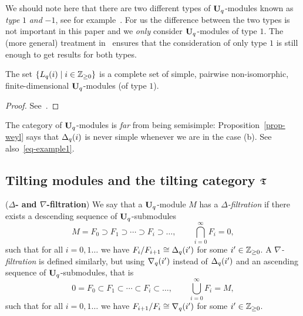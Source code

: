 We should note here that 
there are two different 
types of $\boldsymbol{\mathrm{U}}_q$-modules known as \textit{type} $1$ \textit{and} $-1$, 
see for example~\cite[Section 1]{apw}. 
For us the difference between the two types is not important 
in this paper and we \textit{only} consider $\boldsymbol{\mathrm{U}}_q$-modules of type $1$. 
The (more general) treatment in~\cite[Section 1]{apw} 
ensures that the consideration of only type 
$1$ is still enough to get results for both types.



\begin{cor}\label{cor-simples}
The set $\{L_q({i})\mid i\in\mathbb{Z}_{\geq 0}\}$ is a  
complete set of simple, pairwise non-isomorphic, 
finite-dimensional $\boldsymbol{\mathrm{U}}_q$-modules (of type $1$).\makeqed
\end{cor}


\begin{proof}
See~\cite[Corollary~6.3]{apw}.
\end{proof}



\begin{rem}\label{rem-semisimple}
The category of $\boldsymbol{\mathrm{U}}_q$-modules is 
\textit{far} from being semisimple: Proposition~\ref{prop-weyl} 
says that $\Delta_q({i})$ is never simple whenever we are in the case (b). 
See also~\eqref{eq-example1}.
\end{rem}



\subsection{Tilting modules and the tilting category \texorpdfstring{$\boldsymbol{\mathfrak{T}}$}{T}}\label{sub-tiltmod}
\begin{defn}(\textbf{$\Delta$- and $\nabla$-filtration})\label{defn-filt}
We say that a $\boldsymbol{\mathrm{U}}_q$-module $M$ has 
a $\Delta$\textit{-filtration} if there exists a descending sequence of 
$\boldsymbol{\mathrm{U}}_q$-submodules
\[
M=F_{0}\supset F_1\supset\cdots\supset F_i\supset\dots,\quad\quad\bigcap_{i=0}^{\infty}F_i=0,
\]
such that for all $i=0,1\dots$ we have 
$F_{i}/F_{i+1}\cong \Delta_q({i^{\prime}})$ for 
some $i^{\prime}\in\mathbb{Z}_{\geq 0}$. A $\nabla$\textit{-filtration} is 
defined similarly, but using 
$\nabla_q({i^{\prime}})$ instead of 
$\Delta_q({i^{\prime}})$ and an ascending sequence of $\boldsymbol{\mathrm{U}}_q$-submodules, that is
\[
0=F_{0}\subset F_1\subset\cdots\subset F_i\subset\dots,\quad\quad\bigcup_{i=0}^{\infty}F_i=M,
\]
such that for all $i=0,1\dots$ we 
have $F_{i+1}/F_{i}\cong \nabla_q({i^{\prime}})$ for some $i^{\prime}\in\mathbb{Z}_{\geq 0}$.
\end{defn}


